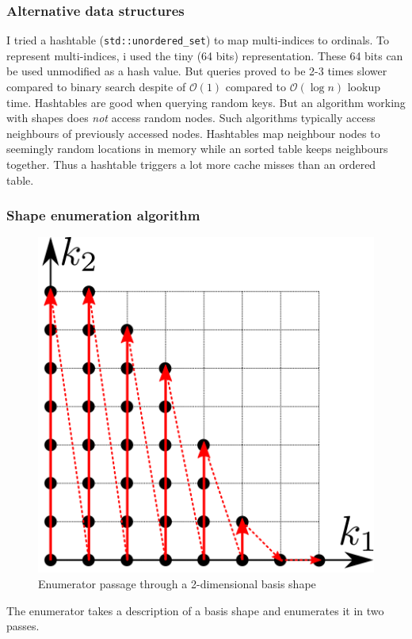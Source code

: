\documentclass{article}
\def\code#1{\texttt{#1}}
\begin{document}
\subsubsection{Alternative data structures}
I tried a hashtable (\code{std::unordered\_set}) to map multi-indices to ordinals.
To represent multi-indices, i used the tiny (64 bits) representation.
These 64 bits can be used unmodified as a hash value.
But queries proved to be 2-3 times slower compared to binary search
despite of \(\mathcal{O}(1)\) compared to \(\mathcal{O}(\log{}n)\) lookup time.
Hashtables are good when querying random keys. But an algorithm working
with shapes does \emph{not} access random nodes.
Such algorithms typically access neighbours of previously accessed nodes.
Hashtables map neighbour nodes to seemingly random locations in memory
while an sorted table keeps neighbours together. Thus a hashtable triggers
a lot more cache misses than an ordered table.

\subsubsection{Shape enumeration algorithm}

\begin{figure}[H]
  \centering
  \includegraphics[]{shape_enumerator}
  \caption{Enumerator passage through a 2-dimensional basis shape}
  \label{fig:shape_example}
\end{figure}

The enumerator takes a description of a basis shape and enumerates it in two passes.
\end{document}
